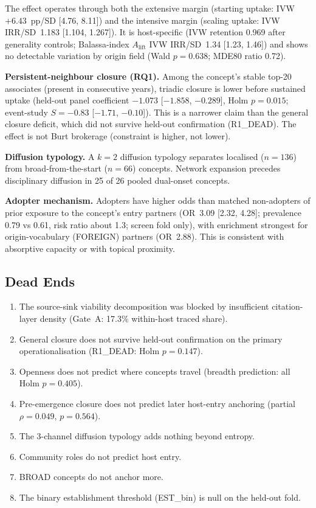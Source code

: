\documentclass[11pt,letterpaper]{article}
\begin{document}
The effect operates through both the extensive margin (starting uptake: IVW $+6.43$~pp/SD [4.76, 8.11]) and the intensive margin (scaling uptake: IVW IRR/SD~1.183 [1.104, 1.267]).
It is host-specific (IVW retention 0.969 after generality controls; Balassa-index $A_{\mathrm{lift}}$ IVW IRR/SD~1.34 [1.23, 1.46]) and shows no detectable variation by origin field (Wald $p = 0.638$; MDE80 ratio 0.72).

\textbf{Persistent-neighbour closure (RQ1).}
Among the concept's stable top-20 associates (present in consecutive years), triadic closure is lower before sustained uptake (held-out panel coefficient $-1.073$ [$-1.858$, $-0.289$], Holm $p = 0.015$; event-study $S = -0.83$ [$-1.71$, $-0.10$]).
This is a narrower claim than the general closure deficit, which did not survive held-out confirmation (R1\_DEAD).
The effect is not Burt brokerage (constraint is higher, not lower).

\textbf{Diffusion typology.}
A $k = 2$ diffusion typology separates localised ($n = 136$) from broad-from-the-start ($n = 66$) concepts.
Network expansion precedes disciplinary diffusion in 25 of 26 pooled dual-onset concepts.

\textbf{Adopter mechanism.}
Adopters have higher odds than matched non-adopters of prior exposure to the concept's entry partners (OR~3.09 [2.32, 4.28]; prevalence 0.79 vs 0.61, risk ratio about 1.3; screen fold only), with enrichment strongest for origin-vocabulary (FOREIGN) partners (OR~2.88). This is consistent with absorptive capacity or with topical proximity.

\subsection{Dead Ends}

\begin{enumerate}
\item The source-sink viability decomposition was blocked by insufficient citation-layer density (Gate~A: 17.3\% within-host traced share).
\item General closure does not survive held-out confirmation on the primary operationalisation (R1\_DEAD: Holm $p = 0.147$).
\item Openness does not predict where concepts travel (breadth prediction: all Holm $p = 0.405$).
\item Pre-emergence closure does not predict later host-entry anchoring (partial $\rho = 0.049$, $p = 0.564$).
\item The 3-channel diffusion typology adds nothing beyond entropy.
\item Community roles do not predict host entry.
\item BROAD concepts do not anchor more.
\item The binary establishment threshold (EST\_bin) is null on the held-out fold.
\end{enumerate}
\end{document}
